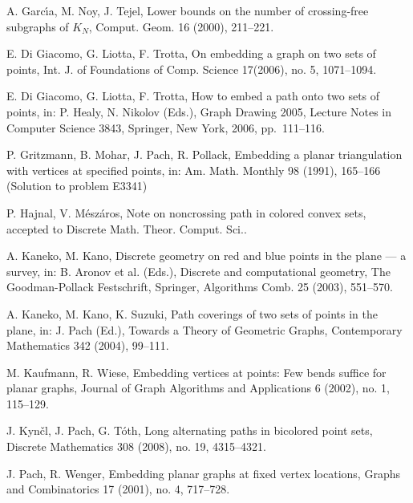 \documentclass[12pt]{article}
\begin{document}
\begin{thebibliography}{ABC}
A. Garc{\'\i}a, M. Noy, J. Tejel,
Lower bounds on the number of crossing-free subgraphs of $K_N$,
Comput. Geom. 16 (2000), 211--221.

E. Di Giacomo, G. Liotta, F. Trotta,
On embedding a graph on two sets of points,
Int. J. of Foundations of Comp. Science 17(2006), no. 5, 1071--1094.

E. Di Giacomo, G. Liotta, F. Trotta,
How to embed a path onto two sets of points,
in: P. Healy, N. Nikolov (Eds.), Graph Drawing 2005, Lecture Notes in Computer Science 3843,
Springer, New York, 2006, pp.\ 111--116.

P. Gritzmann, B. Mohar, J. Pach, R. Pollack,
Embedding a planar triangulation with vertices at specified points,
in: Am. Math. Monthly 98 (1991), 165--166 (Solution to problem E3341)

P. Hajnal, V. M\'esz\'aros, 
Note on noncrossing path in colored convex sets, accepted to Discrete Math. Theor. Comput. Sci..

A. Kaneko, M. Kano,
Discrete geometry on red and blue points in the plane --- a survey,
in: B. Aronov et al. (Eds.), Discrete and computational geometry,
The Goodman-Pollack Festschrift, Springer,
Algorithms Comb. 25 (2003), 551--570.

A. Kaneko, M. Kano, K. Suzuki, Path coverings of two sets of points in the plane,
in: J. Pach (Ed.), Towards a Theory of Geometric Graphs, Contemporary Mathematics 342
(2004), 99--111.

M. Kaufmann, R. Wiese,
Embedding vertices at points: Few bends suffice for planar graphs,
Journal of Graph Algorithms and Applications 6 (2002), no. 1, 115--129.

J. Kyn\v cl, J. Pach, G. T\'oth, Long alternating paths in bicolored point sets, 
Discrete Mathematics 308 (2008), no. 19, 4315--4321.

J. Pach, R. Wenger, 
Embedding planar graphs at fixed vertex locations, 
Graphs and Combinatorics 17 (2001), no. 4, 717--728.


\end{thebibliography}
\end{document}
